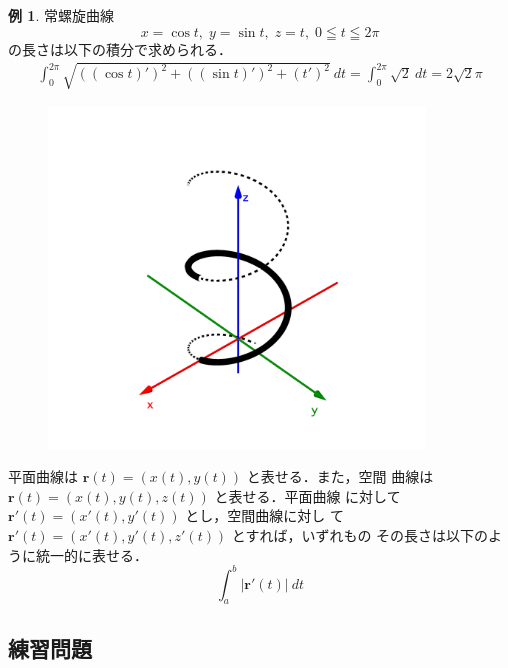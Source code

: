 \documentclass[10pt, uplatex, dvipdfmx]{jsarticle}
\theoremstyle{definition}
\newtheorem{example}[theorem]{例}
\numberwithin{equation}{section}
\begin{document}
\begin{example}
  常螺旋曲線
  \[
    x=\cos t, \; y=\sin t, \; z=t, \; 0 \leqq t \leqq 2\pi
  \]
  の長さは以下の積分で求められる．
  \begin{align*}
    \int_{0}^{2\pi} \sqrt{ \left( \left( \cos t\right)'\right)^2 + \left( \left( \sin t\right)'\right)^2 
        + \left( t'\right)^2} \ dt
        = \int_{0}^{2\pi} \sqrt{2} \ dt = 2\sqrt{2} \pi
  \end{align*}
  \begin{figure}[h]
    \centering
    \includegraphics[width=10cm]{./pictures/05/spiral.png}
  \end{figure}
\end{example}

平面曲線は $\bm{r}(t) = \left( x(t), y(t) \right)$ と表せる．また，空間
曲線は $\bm{r}(t) = \left( x(t), y(t), z(t)\right)$ と表せる．平面曲線
に対して $\bm{r}'(t)=\left( x'(t), y'(t)\right)$ とし，空間曲線に対し
て $\bm{r}'(t)=\left( x'(t), y'(t), z'(t)\right)$ とすれば，いずれもの
その長さは以下のように統一的に表せる．
\[
  \int_{a}^{b} \left| \bm{r}'(t)\right| \ dt
\]

\subsection{練習問題}
\end{document}
